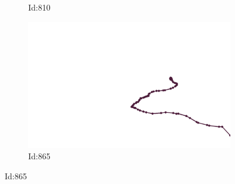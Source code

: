 \documentclass[12pt,twoside]{report}
\begin{document}
\begin{figure}
\begin{subfigure}[b]{0.20\textwidth}
\caption{Id:810}
\end{subfigure}
\begin{subfigure}[b]{0.20\textwidth}
\centering
\includegraphics[width=\textwidth]{../../trajectories/865.png}
\caption{Id:865}
\end{subfigure}
\end{figure}
\end{document}
